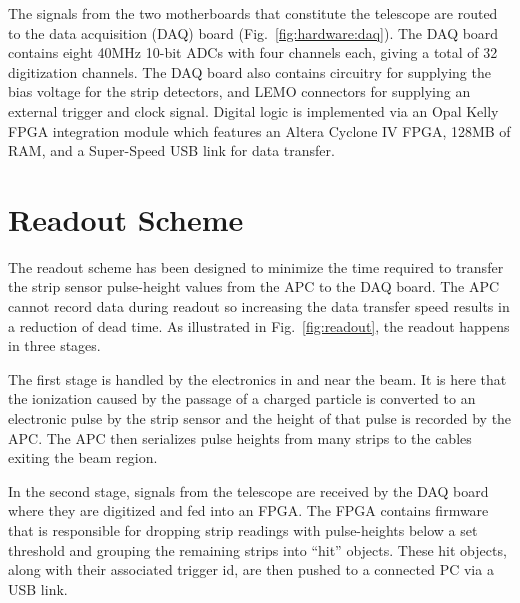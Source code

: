 \documentclass{PoS}
\begin{document}
The signals from the two motherboards that constitute the telescope are routed
to the data acquisition (DAQ) board (Fig.~\ref{fig:hardware:daq}). The DAQ board contains eight
40\si{\mega\hertz} 10-bit ADCs with four channels each, giving a total of 32
digitization channels. The DAQ board also contains circuitry for supplying the
bias voltage for the strip detectors, and LEMO connectors for supplying an
external trigger and clock signal. Digital logic is implemented via an Opal
Kelly FPGA integration module which features an Altera Cyclone IV FPGA, 128MB
of RAM, and a Super-Speed USB link for data transfer.

\section{Readout Scheme}
The readout scheme has been designed to minimize the time required to transfer
the strip sensor pulse-height values from the APC to the DAQ board.  The APC
cannot record data during readout so increasing the data transfer speed results
in a reduction of dead time.  As illustrated in Fig.~\ref{fig:readout}, the
readout happens in three stages.

The first stage is handled by the electronics
in and near the beam. It is here that the ionization caused by the passage of a
charged particle is converted to an electronic pulse by the strip sensor and
the height of that pulse is recorded by the APC. The APC then serializes pulse
heights from many strips to the cables exiting the beam region.

In the second stage, signals from the telescope are received by the DAQ
board where they are digitized and fed into an FPGA. The FPGA contains firmware
that is responsible for dropping strip readings with pulse-heights below a
set threshold and grouping the remaining strips into ``hit'' objects. These hit
objects, along with their associated trigger id, are then pushed to a connected
PC via a USB link.
\end{document}
